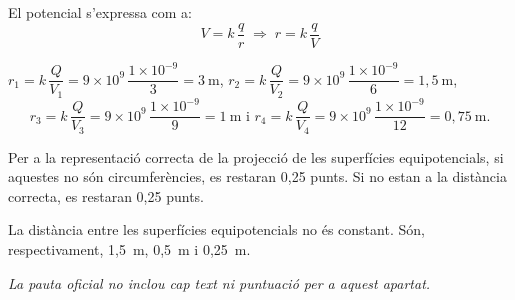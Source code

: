 \begin{solapartat}
 El potencial s'expressa com a:
\[ V = k\,\frac{q}{r} \;\Rightarrow\; r = k\,\frac{q}{V} \]

 $r_1 = k\,\dfrac{Q}{V_1} = 9\times 10^{9}\,\dfrac{1\times 10^{-9}}{3} = 3\ \mathrm{m}$, $r_2 = k\,\dfrac{Q}{V_2} = 9\times 10^{9}\,\dfrac{1\times 10^{-9}}{6} = 1,5\ \mathrm{m}$,
\[ r_3 = k\,\frac{Q}{V_3} = 9\times 10^{9}\,\frac{1\times 10^{-9}}{9} = 1\ \mathrm{m} \text{ i } r_4 = k\,\frac{Q}{V_4} = 9\times 10^{9}\,\frac{1\times 10^{-9}}{12} = 0,75\ \mathrm{m}. \]

 Per a la representació correcta de la projecció de les superfícies equipotencials, si aquestes no són circumferències, es restaran 0,25 punts. Si no estan a la distància correcta, es restaran 0,25 punts.


 La distància entre les superfícies equipotencials no és constant. Són, respectivament, 1,5~m, 0,5~m i 0,25~m.
\end{solapartat}

\begin{solapartat}
\textit{La pauta oficial no inclou cap text ni puntuació per a aquest apartat.}
\end{solapartat}
